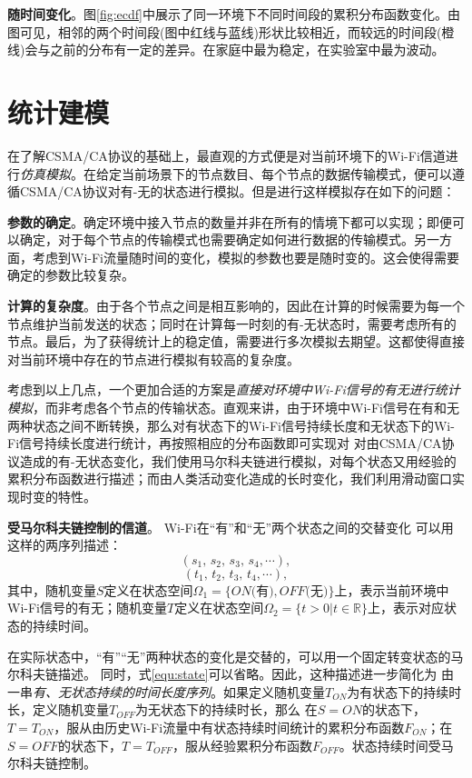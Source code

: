 \textbf{随时间变化}。图\ref{fig:ecdf}中展示了同一环境下不同时间段的累积分布函数变化。由图可见，相邻的两个时间段(图中红线与蓝线)形状比较相近，而较远的时间段(橙线)会与之前的分布有一定的差异。在家庭中最为稳定，在实验室中最为波动。
\section{统计建模}
\label{sec:model}
在了解CSMA/CA协议的基础上，最直观的方式便是对当前环境下的Wi-Fi信道进行\emph{仿真模拟}。在给定当前场景下的节点数目、每个节点的数据传输模式，便可以遵循CSMA/CA协议对有-无的状态进行模拟。但是进行这样模拟存在如下的问题：

\textbf{参数的确定}。确定环境中接入节点的数量并非在所有的情境下都可以实现；即便可以确定，对于每个节点的传输模式也需要确定如何进行数据的传输模式。另一方面，考虑到Wi-Fi流量随时间的变化，模拟的参数也要是随时变的。这会使得需要确定的参数比较复杂。

\textbf{计算的复杂度}。由于各个节点之间是相互影响的，因此在计算的时候需要为每一个节点维护当前发送的状态；同时在计算每一时刻的有-无状态时，需要考虑所有的节点。最后，为了获得统计上的稳定值，需要进行多次模拟去期望。这都使得直接对当前环境中存在的节点进行模拟有较高的复杂度。


考虑到以上几点，一个更加合适的方案是\emph{直接对环境中Wi-Fi信号的有无进行统计模拟}，而非考虑各个节点的传输状态。直观来讲，由于环境中Wi-Fi信号在有和无两种状态之间不断转换，那么对有状态下的Wi-Fi信号持续长度和无状态下的Wi-Fi信号持续长度进行统计，再按照相应的分布函数即可实现对
对由CSMA/CA协议造成的有-无状态变化，我们使用马尔科夫链进行模拟，对每个状态又用经验的累积分布函数进行描述；而由人类活动变化造成的长时变化，我们利用滑动窗口实现时变的特性。

\textbf{受马尔科夫链控制的信道}。
Wi-Fi在“有”和“无”两个状态之间的交替变化
可以用这样的两序列描述：
\begin{equation}
\label{equ:state}
(s_1, \,  s_2, \, s_3 , \, s_4, \cdots),
\end{equation}
\begin{equation}
\label{equ:time}
(t_{1}, \, t_{2}, \, t_{3}, \, t_{4}, \cdots),
\end{equation}
其中，随机变量$S$定义在状态空间$\Omega_1 = \{ON($有$),OFF($无$)\}$上，表示当前环境中Wi-Fi信号的有无；随机变量$T$定义在状态空间$\Omega_2 = \{t > 0 | t \in \mathbb{R}\}$上，表示对应状态的持续时间。

在实际状态中，“有”“无”两种状态的变化是交替的，可以用一个固定转变状态的马尔科夫链描述。
同时，式\ref{equ:state}可以省略。因此，这种描述进一步简化为
由一串\emph{有、无状态持续的时间长度序列}。如果定义随机变量$T_{ON}$为有状态下的持续时长，定义随机变量$T_{OFF}$为无状态下的持续时长，那么
在$S = ON$的状态下，$T = T_{ON}$，服从由历史Wi-Fi流量中有状态持续时间统计的累积分布函数$F_{ON}$；在$S = OFF$的状态下，$T = T_{OFF}$，服从经验累积分布函数$F_{OFF}$。状态持续时间受马尔科夫链控制。

